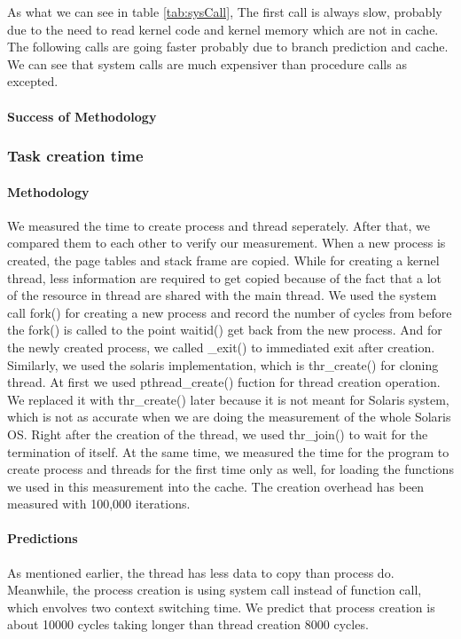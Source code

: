 As what we can see in table \ref{tab:sysCall}, The first call is always slow, probably due to the need to read kernel code and
kernel memory which are not in cache.
The following calls are going faster probably due to branch prediction and
cache.
We can see that system calls are much expensiver than procedure calls as
excepted.


\paragraph{Success of Methodology}


\subsubsection{Task creation time}
\paragraph{Methodology}
We measured the time to create process and thread seperately. After that, we compared them to each other to verify our measurement. When a new process is created, the page tables and stack frame are copied. While for creating a kernel thread, less information are required to get copied because of the fact that a lot of the resource in thread are shared with the main thread.
We used the system call fork() for creating a new process and record the number of cycles from before the fork() is called to the point waitid() get back from the new process. And for the newly created process, we called \_exit() to immediated exit after creation.
Similarly, we used the solaris implementation, which is thr\_create() for cloning thread. At first we used pthread\_create() fuction for thread creation operation. We replaced it with thr\_create() later because it is not meant for Solaris system, which is not as accurate when we are doing the measurement of the whole Solaris OS. Right after the creation of the thread, we used thr\_join() to wait for the termination of itself.
At the same time, we measured the time for the program to create process and threads for the first time only as well, for loading the functions we used in this measurement into the cache.
The creation overhead has been measured with 100,000 iterations.


\paragraph{Predictions}

As mentioned earlier, the thread has less data to copy than process do. Meanwhile, the process creation is using system call instead of function call, which envolves two context switching time. We predict that process creation is about 10000 cycles taking longer than thread creation 8000 cycles.






